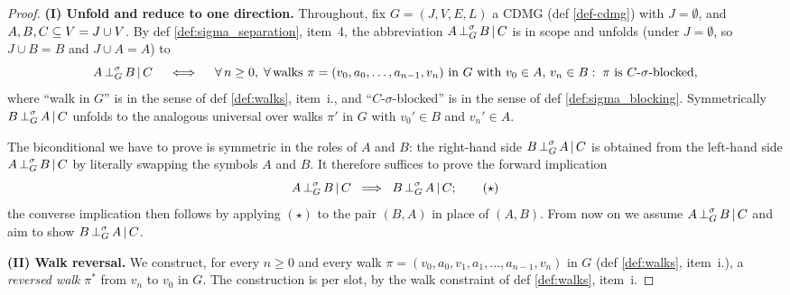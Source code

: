 \documentclass[main]{subfiles}
\begin{document}
\begin{proof}
\medskip\noindent\textbf{(I) Unfold and reduce to one direction.}
Throughout, fix $G = (J, V, E, L)$ a CDMG (def \ref{def-cdmg}) with $J = \emptyset$, and $A, B, C \subseteq V = J \cup V$. By def \ref{def:sigma_separation}, item~4, the abbreviation $A \operatorname{\perp}^{\sigma}_G B \operatorname{|} C$ is in scope and unfolds (under $J = \emptyset$, so $J \cup B = B$ and $J \cup A = A$) to
\[
    A \operatorname{\perp}^{\sigma}_G B \operatorname{|} C
    \quad\iff\quad
    \forall\, n \ge 0, \;\forall\, \text{walks } \pi = (v_0, a_0, \dots, a_{n-1}, v_n) \text{ in } G
    \text{ with } v_0 \in A,\, v_n \in B :\;
    \pi \text{ is } C\text{-}\sigma\text{-blocked},
\]
where ``walk in $G$'' is in the sense of def \ref{def:walks}, item~i., and ``$C$-$\sigma$-blocked'' is in the sense of def \ref{def:sigma_blocking}. Symmetrically $B \operatorname{\perp}^{\sigma}_G A \operatorname{|} C$ unfolds to the analogous universal over walks $\pi'$ in $G$ with $v_0' \in B$ and $v_n' \in A$.

The biconditional we have to prove is symmetric in the roles of $A$ and $B$: the right-hand side $B \operatorname{\perp}^{\sigma}_G A \operatorname{|} C$ is obtained from the left-hand side $A \operatorname{\perp}^{\sigma}_G B \operatorname{|} C$ by literally swapping the symbols $A$ and $B$. It therefore suffices to prove the forward implication
\[
    A \operatorname{\perp}^{\sigma}_G B \operatorname{|} C \;\implies\; B \operatorname{\perp}^{\sigma}_G A \operatorname{|} C; \tag{$\star$}
\]
the converse implication then follows by applying $(\star)$ to the pair $(B, A)$ in place of $(A, B)$. From now on we assume $A \operatorname{\perp}^{\sigma}_G B \operatorname{|} C$ and aim to show $B \operatorname{\perp}^{\sigma}_G A \operatorname{|} C$.

\medskip\noindent\textbf{(II) Walk reversal.}
We construct, for every $n \ge 0$ and every walk $\pi = (v_0, a_0, v_1, a_1, \dots, a_{n-1}, v_n)$ in $G$ (def \ref{def:walks}, item~i.), a \emph{reversed walk} $\pi^*$ from $v_n$ to $v_0$ in $G$. The construction is per slot, by the walk constraint of def \ref{def:walks}, item~i.


\end{proof}
\end{document}
